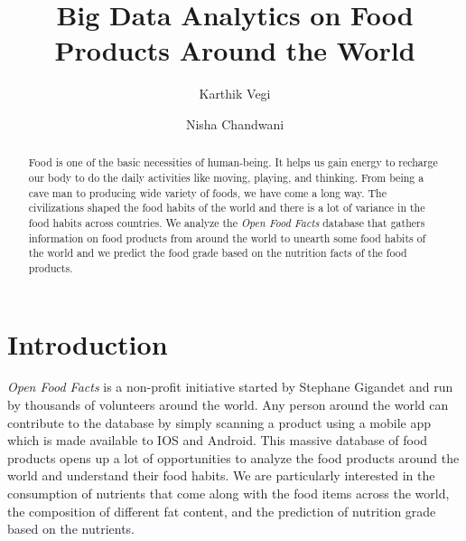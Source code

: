 \documentclass[sigconf]{acmart}
\begin{document}
\title{Big Data Analytics on Food Products Around the World}

\author{Karthik Vegi}

\author{Nisha Chandwani}

\renewcommand{\shortauthors}{kvegi, nchandwa}

\begin{abstract}
Food is one of the basic necessities of human-being. It helps us gain energy to recharge our body to do the daily activities like moving, playing, and thinking. From being a cave man to producing wide variety of foods, we have come a long way. The civilizations shaped the food habits of the world and there is a lot of variance in the food habits across countries. We analyze the {\em Open Food Facts} database that gathers information on food products from around the world to unearth some food habits of the world and we predict the food grade based on the nutrition facts of the food products.
\end{abstract}


\maketitle

\section{Introduction}
{\em Open Food Facts} is a non-profit initiative started by Stephane Gigandet and run by thousands of volunteers around the world. Any person around the world can contribute to the database by simply scanning a product using a mobile app which is made available to IOS and Android. This massive database of food products opens up a lot of opportunities to analyze the food products around the world and understand their food habits. We are particularly interested in the consumption of nutrients that come along with the food items across the world, the composition of different fat content, and the prediction of nutrition grade based on the nutrients.
\end{document}
